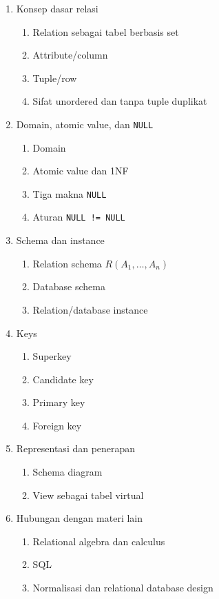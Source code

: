 \begin{enumerate}
    \item \pwajib Konsep dasar relasi
    \begin{enumerate}
        \item \pwajib Relation sebagai tabel berbasis set
        \item \pwajib Attribute/column
        \item \pwajib Tuple/row
        \item \pwajib Sifat unordered dan tanpa tuple duplikat
    \end{enumerate}
    \item \pwajib Domain, atomic value, dan \texttt{NULL}
    \begin{enumerate}
        \item \pwajib Domain
        \item \pwajib Atomic value dan 1NF
        \item \pwajib Tiga makna \texttt{NULL}
        \item \pwajib Aturan \texttt{NULL != NULL}
    \end{enumerate}
    \item \pwajib Schema dan instance
    \begin{enumerate}
        \item \pwajib Relation schema \(R(A_1,\ldots,A_n)\)
        \item \pwajib Database schema
        \item \pwajib Relation/database instance
    \end{enumerate}
    \item \pwajib Keys
    \begin{enumerate}
        \item \pwajib Superkey
        \item \pwajib Candidate key
        \item \pwajib Primary key
        \item \pwajib Foreign key
    \end{enumerate}
    \item \ppaham Representasi dan penerapan
    \begin{enumerate}
        \item \ppaham Schema diagram
        \item \ppaham View sebagai tabel virtual
    \end{enumerate}
    \item \pwajib Hubungan dengan materi lain
    \begin{enumerate}
        \item \pwajib Relational algebra dan calculus
        \item \pwajib SQL
        \item \pwajib Normalisasi dan relational database design
    \end{enumerate}
\end{enumerate}

